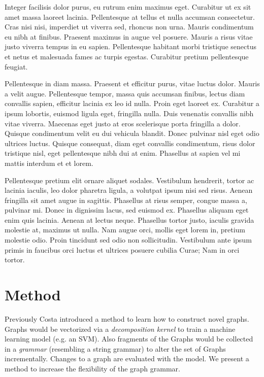 \documentclass{article}
\begin{document}
Integer facilisis dolor purus, eu rutrum enim maximus eget. Curabitur ut ex sit amet massa laoreet lacinia. Pellentesque at tellus et nulla accumsan consectetur. Cras nisi nisi, imperdiet ut viverra sed, rhoncus non urna. Mauris condimentum eu nibh at finibus. Praesent maximus in augue vel posuere. Mauris a risus vitae justo viverra tempus in eu sapien. Pellentesque habitant morbi tristique senectus et netus et malesuada fames ac turpis egestas. Curabitur pretium pellentesque feugiat.

Pellentesque in diam massa. Praesent et efficitur purus, vitae luctus dolor. Mauris a velit augue. Pellentesque tempor, massa quis accumsan finibus, lectus diam convallis sapien, efficitur lacinia ex leo id nulla. Proin eget laoreet ex. Curabitur a ipsum lobortis, euismod ligula eget, fringilla nulla. Duis venenatis convallis nibh vitae viverra. Maecenas eget justo at eros scelerisque porta fringilla a dolor. Quisque condimentum velit eu dui vehicula blandit. Donec pulvinar nisl eget odio ultrices luctus. Quisque consequat, diam eget convallis condimentum, risus dolor tristique nisl, eget pellentesque nibh dui at enim. Phasellus at sapien vel mi mattis interdum et et lorem.

Pellentesque pretium elit ornare aliquet sodales. Vestibulum hendrerit, tortor ac lacinia iaculis, leo dolor pharetra ligula, a volutpat ipsum nisi sed risus. Aenean fringilla sit amet augue in sagittis. Phasellus at risus semper, congue massa a, pulvinar mi. Donec in dignissim lacus, sed euismod ex. Phasellus aliquam eget enim quis lacinia. Aenean at lectus neque. Phasellus tortor justo, iaculis gravida molestie at, maximus ut nulla. Nam augue orci, mollis eget lorem in, pretium molestie odio. Proin tincidunt sed odio non sollicitudin. Vestibulum ante ipsum primis in faucibus orci luctus et ultrices posuere cubilia Curae; Nam in orci tortor.

\section{Method}

Previously Costa introduced a method %
to learn how to construct novel graphs.
Graphs would be vectorized via a \emph{decomposition kernel}
to train a machine learning model (e.g. an SVM).
Also fragments of the Graphs would be collected in 
a \emph{grammar} (resembling a string grammar) to alter the 
set of Graphs incrementally. Changes to a graph are evaluated with the model. 
We present a method to increase the flexibility of the graph grammar.
\end{document}
